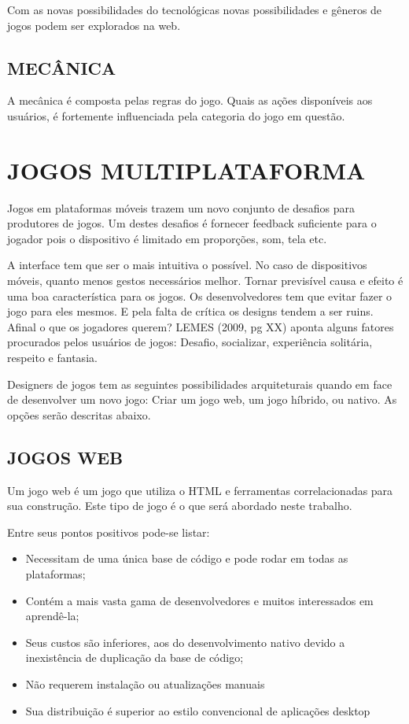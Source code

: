 \documentclass[
12pt,
a4paper,
portuges,
draft
]{report}
\begin{document}
Com as novas possibilidades do tecnológicas novas possibilidades e gêneros de jogos podem ser explorados na web.

\subsection{MECÂNICA}

A mecânica é composta pelas regras do jogo. Quais as ações
disponíveis aos usuários, é fortemente influenciada pela categoria do
jogo em questão.

\section{JOGOS MULTIPLATAFORMA}

Jogos em plataformas móveis trazem um novo conjunto de desafios para
produtores de jogos. Um destes desafios é fornecer feedback suficiente
para o jogador pois o dispositivo é limitado em proporções, som, tela
etc.

A interface tem que ser o mais intuitiva o possível. No caso de
dispositivos móveis, quanto menos gestos necessários melhor. Tornar
previsível causa e efeito é uma boa característica para os jogos.
Os desenvolvedores tem que evitar fazer o jogo para eles mesmos.
E pela falta de crítica os designs tendem a ser ruins. Afinal o
que os jogadores querem? LEMES (2009, pg XX) aponta alguns fatores procurados
pelos usuários de jogos: Desafio, socializar, experiência solitária,
respeito e fantasia.

Designers de jogos tem as seguintes possibilidades arquiteturais
quando em face de desenvolver um novo jogo: Criar um jogo web,
um jogo híbrido, ou nativo. As opções serão descritas abaixo.

\subsection{JOGOS WEB}

Um jogo web é um jogo que utiliza o HTML e
ferramentas correlacionadas para sua construção. Este tipo de jogo
é o que será abordado neste trabalho.

Entre seus pontos positivos pode-se listar:

\begin{itemize}
\item Necessitam de uma única base de código e pode rodar em todas as
plataformas;
\item Contém a mais vasta gama de desenvolvedores e muitos
interessados em aprendê-la;
\item Seus custos são inferiores, aos do desenvolvimento nativo devido a 
inexistência de duplicação da base de código;
\item  Não requerem instalação ou atualizações manuais
\item  Sua distribuição é superior ao estilo convencional de aplicações desktop\autocite{browserGamesTechnologyAndFuture}
\end{itemize}
\end{document}
